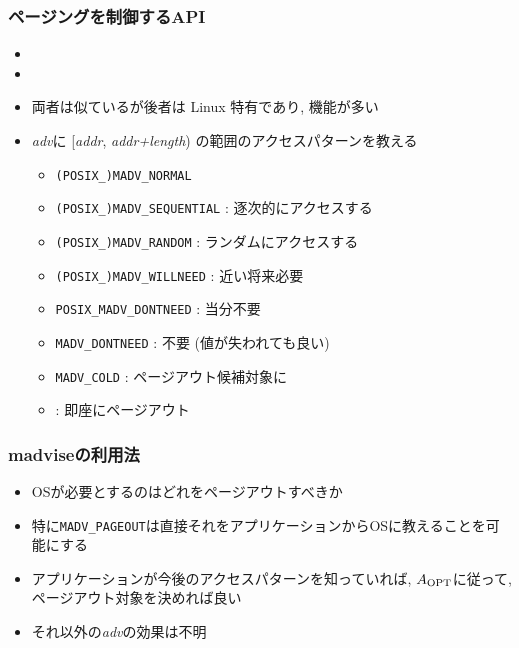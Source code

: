 \documentclass[12pt,dvipdfmx]{beamer}
\begin{document}
\begin{frame}
  \frametitle{ページングを制御するAPI}
  \begin{itemize}
  \item {}
  \item {}
  \item 両者は似ているが後者は Linux 特有であり, 機能が多い
  \item {\it adv}に [{\it addr}, {\it addr+length}) の範囲のアクセスパターンを教える
    \begin{itemize}
    \item {\tt (POSIX\_)MADV\_NORMAL}
    \item {\tt (POSIX\_)MADV\_SEQUENTIAL} : 逐次的にアクセスする
    \item {\tt (POSIX\_)MADV\_RANDOM} : ランダムにアクセスする
    \item {\tt (POSIX\_)MADV\_WILLNEED} : 近い将来必要
    \item {\tt POSIX\_MADV\_DONTNEED} : 当分不要
    \item {\tt MADV\_DONTNEED} : 不要 (値が失われても良い)
    \item {\tt MADV\_COLD} : ページアウト候補対象に
    \item {} : 即座にページアウト
    \end{itemize}
  \end{itemize}
\end{frame}

\begin{frame}
  \frametitle{madviseの利用法}
  \begin{itemize}
  \item OSが必要とするのはどれをページアウトすべきか
  \item 特に{\tt MADV\_PAGEOUT}は直接それをアプリケーションからOSに教えることを可能にする
  \item アプリケーションが今後のアクセスパターンを知っていれば,
    $A_{\mbox{\scriptsize OPT}}$に従って, ページアウト対象を決めれば良い
  \item それ以外の{\it adv}の効果は不明
  \end{itemize}
\end{frame}
\end{document}
